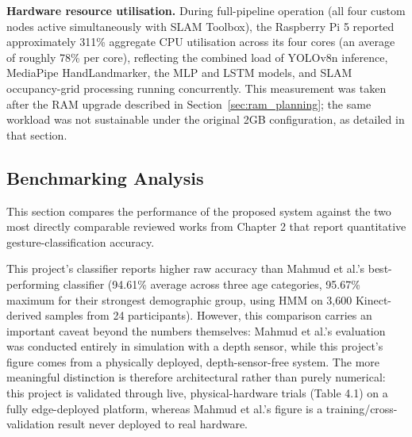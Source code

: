 \textbf{Hardware resource utilisation.} During full-pipeline operation (all four custom nodes active simultaneously with SLAM Toolbox), the Raspberry Pi 5 reported approximately 311\% aggregate CPU utilisation across its four cores (an average of roughly 78\% per core), reflecting the combined load of YOLOv8n inference, MediaPipe HandLandmarker, the MLP and LSTM models, and SLAM occupancy-grid processing running concurrently. This measurement was taken after the RAM upgrade described in Section~\ref{sec:ram_planning}; the same workload was not sustainable under the original 2GB configuration, as detailed in that section.

\subsection{Benchmarking Analysis}

This section compares the performance of the proposed system against the two most directly comparable reviewed works from Chapter 2 that report quantitative gesture-classification accuracy.

\begin{table}[H]
\centering
\caption{Benchmarking Against Reviewed Gesture Recognition Systems}
\label{tab:benchmarking}
\end{table}

This project's classifier reports higher raw accuracy than Mahmud et al.'s best-performing classifier (94.61\% average across three age categories, 95.67\% maximum for their strongest demographic group, using HMM on 3,600 Kinect-derived samples from 24 participants). However, this comparison carries an important caveat beyond the numbers themselves: Mahmud et al.'s evaluation was conducted entirely in simulation with a depth sensor, while this project's figure comes from a physically deployed, depth-sensor-free system. The more meaningful distinction is therefore architectural rather than purely numerical: this project is validated through live, physical-hardware trials (Table 4.1) on a fully edge-deployed platform, whereas Mahmud et al.'s figure is a training/cross-validation result never deployed to real hardware.

